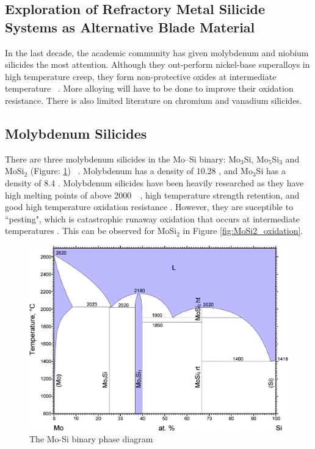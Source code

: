 \subsection{Exploration of Refractory Metal Silicide Systems as Alternative Blade Material}
In the last decade, the academic community has given molybdenum and niobium silicides the most attention.  Although they out-perform nickel-base superalloys in high temperature creep, they form non-protective oxides at intermediate temperature ~\cite{tomasi97, yanagihara96, sauthoff88, ochiai06, mitra06, miracle94}.  More alloying will have to be done to improve their oxidation resistance.  There is also limited literature on chromium and vanadium silicides.
%
 			
\subsection{Molybdenum Silicides}
There are three molybdenum silicides in the Mo--Si binary: Mo$_3$Si, Mo$_5$Si$_3$ and MoSi$_2$ (Figure: \ref{fig:MoSi}) ~\cite{svechnikov70}. Molybdenum has a density of 10.28 \gram\usk\centi\rpcubic\meter, and Mo$_3$Si has a density of 8.4 \gram\usk\centi\rpcubic\meter.
Molybdenum silicides have been heavily researched as they have high melting points of above 2000\celsius\ ~\cite{svechnikov70}, high temperature strength retention, and good high temperature oxidation resistance .  However, they are suceptible to ``pesting", which is catastrophic runaway oxidation that occurs at intermediate temperatures \cite{shah92}. This can be observed for MoSi$_2$ in Figure \ref{fig:MoSi2_oxidation}. 
%
\vspace{6mm}
\begin{figure}[H]
\begin{center}
\includegraphics[width=15cm]{MoSi}
\caption{The Mo-Si binary phase diagram ~\cite{svechnikov70}}
\label{fig:MoSi}
\end{center}
\end{figure}
